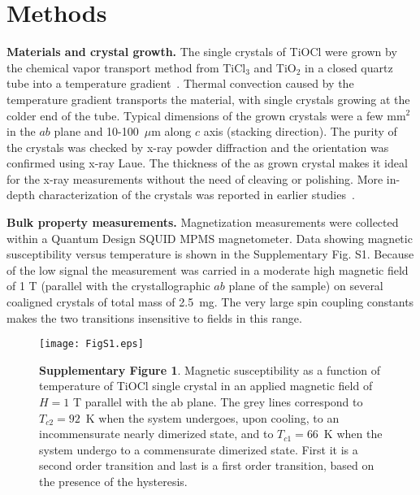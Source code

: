 \documentclass[preprint,superscriptaddress,amsmath,amssymb,aps,prl]{revtex4-1}
\begin{document}
\section*{Methods}

\textbf{Materials and crystal growth.} The single crystals of TiOCl were grown by the chemical vapor transport method from TiCl$_{3}$ and TiO$_{2}$ in a closed quartz tube into a temperature gradient~\cite{Schafer1958,Seidel2003}. Thermal convection caused by the temperature gradient transports the material, with single crystals growing at the colder end of the tube. Typical dimensions of the grown crystals were a few mm$^2$ in the $ab$ plane and 10-100~${\mu}$m along $c$ axis (stacking direction). The purity of the crystals was checked by x-ray powder diffraction and the orientation was confirmed using x-ray Laue. The thickness of the as grown crystal makes it ideal for the x-ray measurements without the need of cleaving or polishing. More in-depth characterization of the crystals was reported in earlier studies~\cite{Abel2007,Prodi2010}.

\textbf{Bulk property measurements.} Magnetization measurements were collected within a Quantum Design SQUID MPMS magnetometer. Data showing magnetic susceptibility versus temperature is shown in the Supplementary Fig. S1. Because of the low signal the measurement was carried in a moderate high magnetic field of 1 T (parallel with the crystallographic $ab$ plane of the sample) on several coaligned crystals of total mass of 2.5~mg. The very large spin coupling constants makes the two transitions insensitive to fields in this range.

\begin{center}
\begin{figure}
\begin{center}
\texttt{[image: FigS1.eps]}
\caption{\textbf{Supplementary Figure 1}. Magnetic susceptibility as a function of temperature of TiOCl single crystal in an applied magnetic field of $H=1$ T parallel with the ab plane. The grey lines correspond to $T_{c2}=92$~K when the system undergoes, upon cooling, to an incommensurate nearly dimerized state, and to $T_{c1}=66$~K when the system undergo to a commensurate dimerized state. First it is a second order transition and last is a first order transition, based on the presence of the hysteresis.}
\label{fig:FigS1}
\end{center}
\end{figure}
\end{center}
\end{document}

